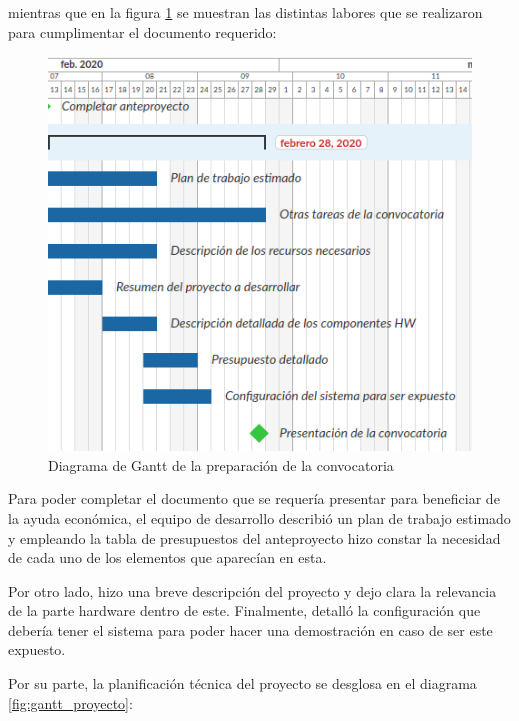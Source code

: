 mientras que en la figura \ref{fig:gantt_convocatoria} se muestran las distintas
labores que se realizaron para cumplimentar el documento requerido:

\begin{figure}[H]
    \centering
    \includegraphics[width=1\linewidth]{pictures/PreparacionConvocatoria.png}
    \caption{Diagrama de Gantt de la preparación de la convocatoria}
    \label{fig:gantt_convocatoria}
\end{figure}

Para poder completar el documento que se requería presentar para beneficiar de la ayuda económica, el equipo de desarrollo describió un plan de trabajo estimado y empleando la tabla de presupuestos del anteproyecto hizo constar la necesidad de cada uno de los elementos que aparecían en esta.

Por otro lado, hizo una breve descripción del proyecto y dejo clara la relevancia de la parte hardware dentro de este. Finalmente, detalló la configuración que debería tener el sistema para poder hacer una demostración en caso de ser este expuesto.

Por su parte, la planificación técnica del proyecto se desglosa en el diagrama
\ref{fig:gantt_proyecto}:


